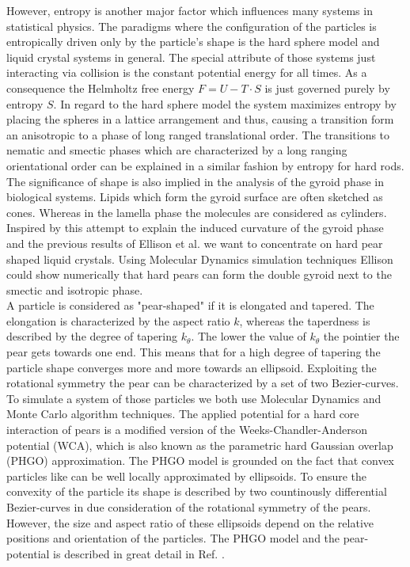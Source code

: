 \documentclass[epj,twocolumn]{webofc}
\begin{document}
However, entropy is another major factor which influences many systems in statistical physics. The paradigms where the configuration of the particles is entropically driven only by the particle's shape is the hard sphere model and 
liquid crystal systems in general. The special attribute of those systems just interacting via collision is the constant potential energy for all times. As a consequence the Helmholtz free energy $F=U-T\cdot S$ is just governed purely 
by entropy $S$. In regard to the hard sphere model the system maximizes entropy by placing the spheres in a lattice arrangement and thus, causing a transition form an anisotropic to a phase of long ranged translational order. The 
transitions to nematic and smectic phases which are characterized by a long ranging orientational order can be explained in a similar fashion by entropy for hard rods.\\

The significance of shape is also implied in the analysis of the gyroid phase in biological systems. Lipids which form the gyroid surface are often sketched as cones. Whereas in the lamella phase the molecules are considered as
cylinders. Inspired by this attempt to explain the induced curvature of the gyroid phase and the previous results of Ellison et al. \cite{} we want to concentrate on hard pear shaped liquid crystals. Using Molecular Dynamics 
simulation techniques Ellison could show numerically that hard pears can form the double gyroid next to the smectic and isotropic phase.\\

A particle is considered as "pear-shaped" if it is elongated and tapered. The elongation is characterized by the aspect ratio $k$, whereas the taperdness is described by the degree of tapering $k_{\theta}$. The lower the value of 
$k_{\theta}$ the pointier the pear gets towards one end. This means that for a high degree of tapering the particle shape converges more and more towards an ellipsoid. Exploiting the rotational symmetry the pear can be characterized by 
a set of two Bezier-curves.\\

To simulate a system of those particles we both use Molecular Dynamics and Monte Carlo algorithm techniques. The applied potential for a hard core interaction of pears is a modified version of the Weeks-Chandler-Anderson 
potential (WCA), which is also known as the parametric hard Gaussian overlap (PHGO) approximation. The PHGO model is grounded on the fact that convex particles like can be well locally approximated by ellipsoids. To ensure 
the convexity of the particle its shape is described by two countinously differential Bezier-curves in due consideration of the rotational symmetry of the pears. However, the size and aspect ratio of these ellipsoids depend on the 
relative positions and orientation of the particles. The PHGO model and the pear-potential is described in great detail in Ref. \cite{}.
\end{document}
